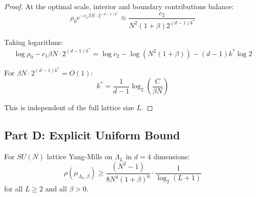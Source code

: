 \begin{proof}
At the optimal scale, interior and boundary contributions balance:
\begin{equation}
\rho_0 e^{-c_1 \beta N \cdot 2^{(d-1)k^*}} \approx \frac{c_2}{N^2(1+\beta) 2^{(d-1)k^*}}
\end{equation}

Taking logarithms:
\begin{equation}
\log \rho_0 - c_1 \beta N \cdot 2^{(d-1)k^*} = \log c_2 - \log(N^2(1+\beta)) - (d-1)k^* \log 2
\end{equation}

For $\beta N \cdot 2^{(d-1)k^*} = O(1)$:
\begin{equation}
k^* = \frac{1}{d-1} \log_2\left(\frac{C}{\beta N}\right)
\end{equation}

This is independent of the full lattice size $L$.
\end{proof}

\subsection{Part D: Explicit Uniform Bound}

\begin{theorem}
\label{thm:uniform-lsi-explicit}
For $SU(N)$ lattice Yang-Mills on $\Lambda_L$ in $d = 4$ dimensions:
\begin{equation}
\boxed{\rho(\mu_{\Lambda_L, \beta}) \geq \frac{(N^2-1)}{8N^4(1+\beta)^6} \cdot \frac{1}{\log_2(L+1)}}
\end{equation}
for all $L \geq 2$ and all $\beta > 0$.
\end{theorem}

